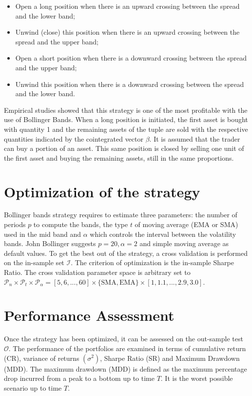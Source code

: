 \documentclass[11pt,a4,twosided,singlespacing,titlepagenumber=on]{scrreprt}
\numberwithin{equation}{chapter} %
\theoremstyle{remark}
\begin{document}
\begin{itemize}
\item Open a long position when there is an upward crossing between the spread and the lower band;
\item Unwind (close) this position when there is an upward crossing between the spread and the upper band;
\item Open a short position when there is a downward crossing between the spread and the upper band;
\item Unwind this position when there is a downward crossing between the spread and the lower band.
\end{itemize}
Empirical studies showed that this strategy is one of the most profitable with the use of Bollinger Bands. When a long position is initiated, the first asset is bought with quantity 1 and the remaining assets of the tuple are sold with the respective quantities indicated by the cointegrated vector $\beta$. It is assumed that the trader can buy a portion of an asset. This same position is closed by selling one unit of the first asset and buying the remaining assets, still in the same proportions.


\section{Optimization of the strategy}
Bollinger bands strategy requires to estimate three parameters: the number of periods $p$ to compute the bands, the type $t$ of moving average (EMA or SMA) used in the mid band and $\alpha$ which controls the interval between the volatility bands. John Bollinger suggests $p = 20, \alpha = 2$ and simple moving average as default values. To get the best out of the strategy, a cross validation is performed on the in-sample set $\mathcal{I}$. The criterion of optimization is the in-sample Sharpe Ratio. The cross validation parameter space is arbitrary set to $\mathcal{P}_n \times \mathcal{P}_t \times \mathcal{P}_\alpha = [5,6,...,60] \times \{\text{SMA}, \text{EMA}\} \times [1,1.1,...,2.9,3.0]$.

\section{Performance Assessment}
Once the strategy has been optimized, it can be assessed on the out-sample test $\mathcal{O}$. The performance of the portfolios are examined in terms of cumulative return (CR), variance of returns $(\sigma^2)$, Sharpe Ratio (SR) and Maximum Drawdown (MDD). The maximum drawdown (MDD) is defined as the maximum percentage drop incurred from a peak to a bottom up to time $T$. It is the worst possible scenario up to time $T$.
\end{document}
